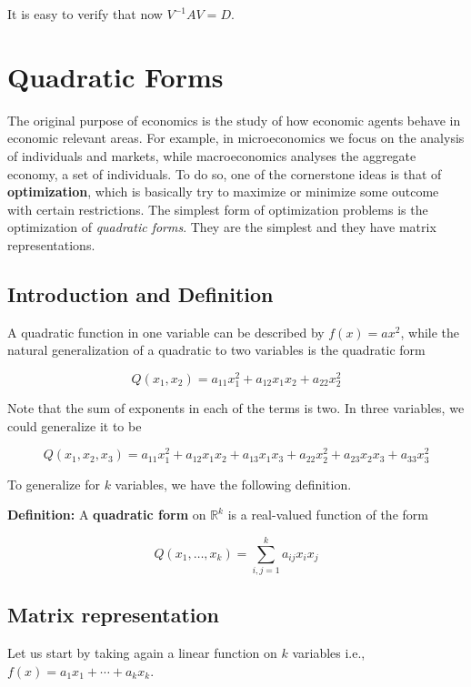 \documentclass[11pt]{article}
\begin{document}
It is easy to verify that now \(V^{-1}AV = D\).

\hypertarget{quadratic-forms}{%
\section{Quadratic Forms}\label{quadratic-forms}}

The original purpose of economics is the study of how economic agents
behave in economic relevant areas. For example, in microeconomics we
focus on the analysis of individuals and markets, while macroeconomics
analyses the aggregate economy, a set of individuals. To do so, one of
the cornerstone ideas is that of \textbf{optimization}, which is
basically try to maximize or minimize some outcome with certain
restrictions. The simplest form of optimization problems is the
optimization of \emph{quadratic forms}. They are the simplest and they
have matrix representations.

\hypertarget{introduction-and-definition}{%
\subsection{Introduction and
Definition}\label{introduction-and-definition}}

A quadratic function in one variable can be described by
\(f(x) = ax^2\), while the natural generalization of a quadratic to two
variables is the quadratic form

\[
Q(x_1, x_2) = a_{11}x_1^2 + a_{12}x_1 x_2 + a_{22} x_2^2
\]

Note that the sum of exponents in each of the terms is two. In three
variables, we could generalize it to be

\[
Q(x_1, x_2, x_3) = a_{11}x_1^2 + a_{12}x_1 x_2 + a_{13}x_1 x_3 + a_{22} x_2^2 + a_{23}x_2 x_3 + a_{33} x_3^2
\]

To generalize for \(k\) variables, we have the following definition.

\textbf{Definition:} A \textbf{quadratic form} on \(\mathbb{R}^k\) is a
real-valued function of the form

\[
Q(x_1, \ldots, x_k) = \sum^k_{i,j = 1} a_{ij}x_i x_j
\]

\hypertarget{matrix-representation}{%
\subsection{Matrix representation}\label{matrix-representation}}

Let us start by taking again a linear function on \(k\) variables i.e.,
\(f(x) = a_1 x_1 + \cdots + a_k x_k\).
\end{document}
